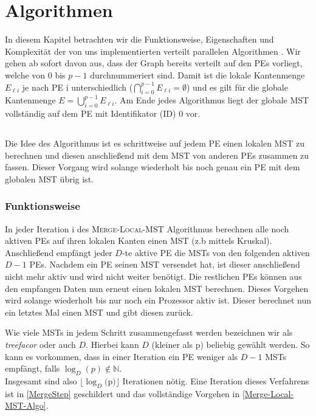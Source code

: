 \section{Algorithmen}\label{Algorithms}
In diesem Kapitel betrachten wir die Funktionsweise, Eigenschaften und Komplexität der von uns implementierten verteilt parallelen Algorithmen \cite{adler1998communication, dehne1998practical}.
Wir gehen ab sofort davon aus, dass der Graph bereits verteilt auf den PEs vorliegt, welche von $0$ bis $p-1$ durchnummeriert sind.
Damit ist die lokale Kantenmenge $E_{\ell i}$ je nach PE i unterschiedlich ($\bigcap_{i=0}^{p-1} E_{\ell i}=\emptyset$) und es gilt für die globale Kantenmenge $E = \bigcup_{i=0}^{p-1} E_{\ell i}$.
Am Ende jedes Algorithmus liegt der globale MST vollständig auf dem PE mit Identifikator (ID) 0 vor.

\subsection{\mergeMST}
Die Idee des \mergeMST Algorithmus ist es schrittweise auf jedem PE einen lokalen MST zu berechnen und diesen anschließend mit dem MST von anderen PEs zusammen zu fassen. Dieser Vorgang wird solange wiederholt bis noch genau ein PE mit dem globalen MST übrig ist.


\subsubsection{Funktionsweise}
In jeder Iteration i des  \textsc{Merge-Local-MST} Algorithmus berechnen alle noch aktiven PEs auf ihren lokalen Kanten einen MST (z.b mittels Kruskal). Anschließend empfängt jeder $D$-te aktive PE die MSTs von den folgenden aktiven $D-1$ PEs. Nachdem ein PE seinen MST versendet hat, ist dieser anschließend nicht mehr aktiv und wird nicht weiter benötigt. Die restlichen PEs können aus den empfangen Daten nun erneut einen lokalen MST berechnen.
Dieses Vorgehen wird solange wiederholt bis nur noch ein Prozessor aktiv ist. Dieser berechnet nun ein letztes Mal einen MST und gibt diesen zurück.

Wie viele MSTs in jedem Schritt zusammengefasst werden bezeichnen wir als \emph{treefacor} oder auch $D$. Hierbei kann $D$ (kleiner als p) beliebig gewählt werden. So kann es vorkommen, dass in einer Iteration ein PE weniger als $D-1$ MSTs empfängt, falls $\log_D(p) \notin \mathbb{N}$.\\
Insgesamt sind also $\lfloor \log_{D}($p$) \rfloor $ Iterationen nötig.
Eine Iteration dieses Verfahrens ist in \cref{MergeStep} geschildert und das vollständige Vorgehen in \cref{Merge-Local-MST-Algo}.


